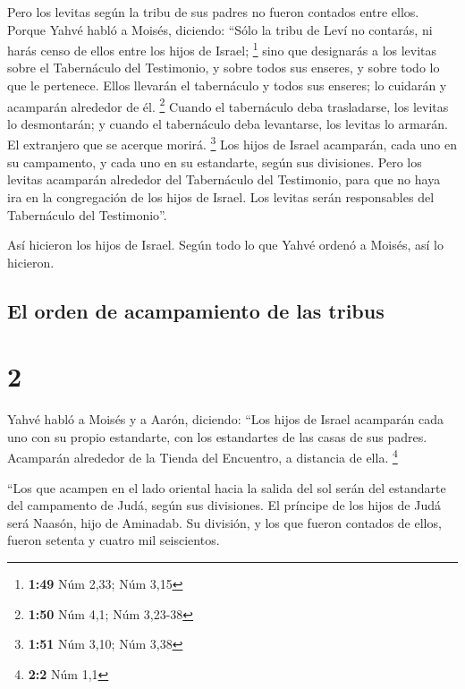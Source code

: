  Pero los levitas según la tribu de sus padres no fueron
contados entre ellos.  Porque Yahvé habló a Moisés,
diciendo:  ``Sólo la tribu de Leví no contarás, ni harás
censo de ellos entre los hijos de Israel; \footnote{\textbf{1:49} Núm
  2,33; Núm 3,15}  sino que designarás a los levitas
sobre el Tabernáculo del Testimonio, y sobre todos sus enseres, y sobre
todo lo que le pertenece. Ellos llevarán el tabernáculo y todos sus
enseres; lo cuidarán y acamparán alrededor de él. \footnote{\textbf{1:50}
  Núm 4,1; Núm 3,23-38}  Cuando el tabernáculo deba
trasladarse, los levitas lo desmontarán; y cuando el tabernáculo deba
levantarse, los levitas lo armarán. El extranjero que se acerque morirá.
\footnote{\textbf{1:51} Núm 3,10; Núm 3,38}  Los hijos de
Israel acamparán, cada uno en su campamento, y cada uno en su
estandarte, según sus divisiones.  Pero los levitas
acamparán alrededor del Tabernáculo del Testimonio, para que no haya ira
en la congregación de los hijos de Israel. Los levitas serán
responsables del Tabernáculo del Testimonio''.

 Así hicieron los hijos de Israel. Según todo lo que
Yahvé ordenó a Moisés, así lo hicieron.

\hypertarget{el-orden-de-acampamiento-de-las-tribus}{%
\subsection{El orden de acampamiento de las
tribus}\label{el-orden-de-acampamiento-de-las-tribus}}

\hypertarget{section-1}{%
\section{2}\label{section-1}}

 Yahvé habló a Moisés y a Aarón, diciendo: 
``Los hijos de Israel acamparán cada uno con su propio estandarte, con
los estandartes de las casas de sus padres. Acamparán alrededor de la
Tienda del Encuentro, a distancia de ella. \footnote{\textbf{2:2} Núm
  1,1}

 ``Los que acampen en el lado oriental hacia la salida del
sol serán del estandarte del campamento de Judá, según sus divisiones.
El príncipe de los hijos de Judá será Naasón, hijo de Aminadab.
 Su división, y los que fueron contados de ellos, fueron
setenta y cuatro mil seiscientos.

